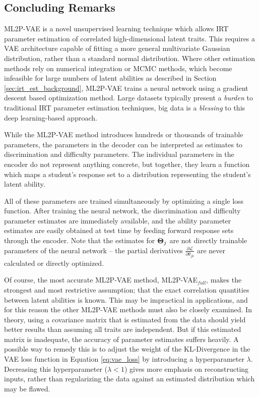 \subsection{Concluding Remarks}
ML2P-VAE is a novel unsupervised learning technique which allows IRT parameter estimation of correlated high-dimensional latent traits. This requires a VAE architecture capable of fitting a more general multivariate Gaussian distribution, rather than a standard normal distribution. Where other estimation methods rely on numerical integration or MCMC methods, which become infeasible for large numbers of latent abilities as described in Section \ref{sec:irt_est_background}, ML2P-VAE trains a neural network using a gradient descent based optimization method. Large datasets typically present a \textit{burden} to traditional IRT parameter estimation techniques, big data is a \textit{blessing} to this deep learning-based approach.

While the ML2P-VAE method introduces hundreds or thousands of trainable parameters, the parameters in the decoder can be interpreted as estimates to discrimination and difficulty parameters. The individual parameters in the encoder do not represent anything concrete, but together, they learn a function which maps a student's response set to a distribution representing the student's latent ability.

All of these parameters are trained simultaneously by optimizing a single loss function. After training the neural network, the discrimination and difficulty parameter estimates are immediately available, and the ability parameter estimates are easily obtained at test time by feeding forward response sets through the encoder. Note that the estimates for $\boldsymbol{\Theta}_j$ are not directly trainable parameters of the neural network -- the partial derivatives $\frac{\partial \mathcal{L}}{\partial \theta_{jk}}$ are never calculated or directly optimized.

Of course, the most accurate ML2P-VAE method, ML2P-VAE$_{full}$, makes the strongest and most restrictive assumption; that the exact correlation quantities between latent abilities is known. This may be impractical in applications, and for this reason the other ML2P-VAE methods must also be closely examined. In theory, using a covariance matrix that is estimated from the data should yield better results than assuming all traits are independent. But if this estimated matrix is inadequate, the accuracy of parameter estimates suffers heavily. A possible way to remedy this is to adjust the weight of the KL-Divergence in the VAE loss function in Equation \ref{eq:vae_loss} by introducing a hyperparameter $\lambda$. Decreasing this hyperparameter ($\lambda < 1$) gives more emphasis on reconstructing inputs, rather than regularizing the data against an estimated distribution which may be flawed.

